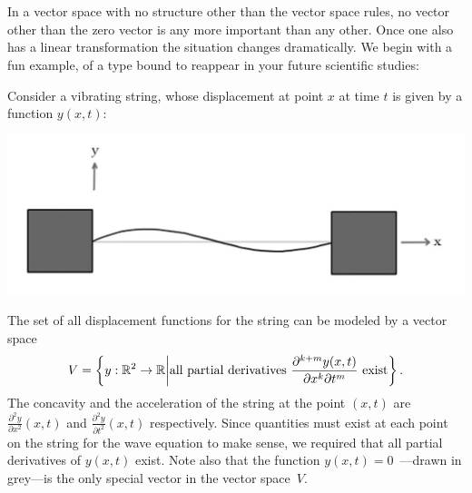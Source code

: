 

\chapter{\eigenTitle}
\label{eigenvalseigenvects}

In a vector space with no structure other than the vector space rules, no vector other than the zero vector  is any  more important than any other.
Once one also has a linear transformation the situation changes dramatically. We begin with a fun example, of a type bound to reappear in your future scientific studies:

\begin{example}

Consider a vibrating string, 
whose displacement at point $x$ at time $t$ is given by a function $y(x,t)$:
\begin{center}
\includegraphics[scale=.3]{string.jpg}
\end{center}
The set of all displacement functions for the string 
can be modeled by 
a vector space 
$$V=\left\{ y:\mathbb{R}^2 \to \mathbb{R} \middle| \mbox{\rm all partial derivatives } \frac{\partial^{k+m}y(x,t)}{\partial x^k\partial t^m} \mbox{ exist}\right\}.$$ 
 The concavity and 
 the acceleration of the string at the point $(x,t)$ are 
 $\frac{\partial^2y}{\partial x^2}(x,t)$ and $\frac{\partial^2y}{\partial t^2}(x,t)$ respectively. 
 Since quantities must exist at each point on the string for the wave equation to make sense, 
 we required that all partial derivatives of $y(x,t)$ exist.
 Note also that the function $y(x,t)=0$~---drawn in grey---is the only special vector in the vector space~$V$. 


\end{example}
